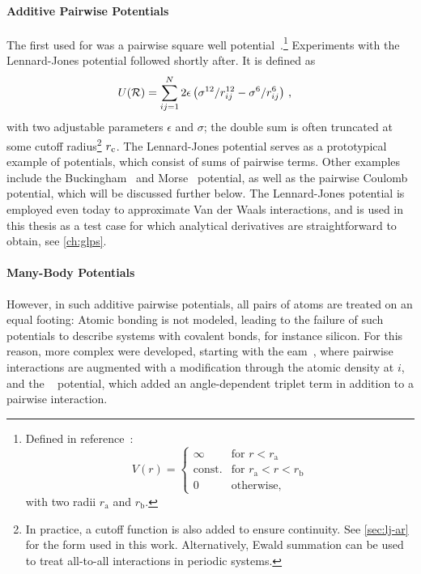 \paragraph{Additive Pairwise Potentials} The first \ff used for \md was a pairwise square well potential~\cite{aw1957p,aw1959p}.\footnote{Defined in reference~\cite{aw1959p}:
\begin{equation*}
	V(r) = \begin{cases}
		\infty &  \text{for } r < r_{\text{a}} \\
		\text{const.} & \text{for } r_{\text{a}} < r < r_{\text{b}} \\
		0 &  \text{otherwise,}
	\end{cases}
\end{equation*}
with two radii $r_{\text{a}}$ and $r_{\text{b}}$.}
Experiments with the Lennard-Jones \cite{l1924p} potential followed shortly after. 
It is defined as
\begin{align}
    U(\Rgen) &= \sum_{ij=1}^N 2 \epsilon \left( \sigma^{12}/r_{ij}^{12} -\sigma^6/r_{ij}^6 \right) \, , \label{eq:ff_lj}
\end{align}
with two adjustable parameters $\epsilon$ and $\sigma$; the double sum is often truncated at some cutoff radius\footnote{In practice, a cutoff function is also added to ensure continuity. See \cref{sec:lj-ar} for the form used in this work. Alternatively, Ewald summation can be used to treat all-to-all interactions in periodic systems.} $r_{\text{c}}$.
The Lennard-Jones potential serves as a prototypical example of  potentials, which consist of sums of pairwise terms. Other examples include the Buckingham~\cite{bl1938p} and Morse~\cite{m1929p} potential, as well as the pairwise Coulomb potential, which will be discussed further below. The Lennard-Jones potential is employed even today to approximate Van der Waals interactions, and is used in this thesis as a test case for which analytical derivatives are straightforward to obtain, see \cref{ch:glps}.

\paragraph{Many-Body Potentials} However, in such additive pairwise potentials, all pairs of atoms are treated on an equal footing: Atomic bonding is not modeled, leading to the failure of such  potentials to describe systems with covalent bonds, for instance silicon. For this reason, more complex  \ffs were developed, starting with the \gls{eam}~\cite{db1983p,db1984p}, where pairwise interactions are augmented with a modification through the atomic density at $i$, and the \sw~\cite{sw1985p} potential, which added an angle-dependent triplet term in addition to a pairwise interaction.

